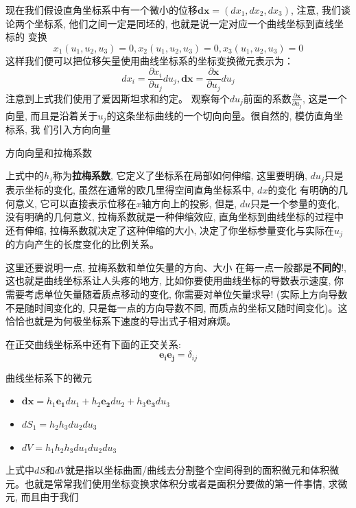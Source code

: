 现在我们假设直角坐标系中有一个微小的位移$\bm{dx}=(dx_1,dx_2,dx_3)$, 注意, 我们谈论两个坐标系, 他们之间一定是同坯的, 也就是说一定对应一个曲线坐标到直线坐标的
变换$$x_1(u_1,u_2,u_3)=0,x_2(u_1,u_2,u_3)=0,x_3(u_1,u_2,u_3)=0$$这样我们便可以把位移矢量使用曲线坐标系的坐标变换微元表示为：
$$dx_i=\frac{\partial x_i}{\partial u_j}du_j,\bm{dx}=\frac{\partial \bm{x}}{\partial u_j}du_j$$注意到上式我们使用了爱因斯坦求和约定。
观察每个$du_j$前面的系数$\frac{\partial \bm{x}}{\partial u_j}$, 这是一个向量, 而且是沿着关于$u_j$的这条坐标曲线的一个切向向量。很自然的, 模仿直角坐标系, 我
们引入方向向量
\begin{define}{方向向量和拉梅系数}
    \begin{lequation}
\end{lequation}
\end{define}
上式中的$h_j$称为\textbf{拉梅系数}, 它定义了坐标系在局部如何伸缩, 这里要明确, $du_j$只是表示坐标的变化, 虽然在通常的欧几里得空间直角坐标系中, $dx$的变化
有明确的几何意义, 它可以直接表示位移在$x$轴方向上的投影, 但是, $du$只是一个参量的变化, 没有明确的几何意义, 拉梅系数就是一种伸缩效应, 直角坐标到曲线坐标的过程中
还有伸缩, 拉梅系数就决定了这种伸缩的大小, 决定了你坐标参量变化与实际在$u_j$的方向产生的长度变化的比例关系。
\begin{thinknote}
    这里还要说明一点, 拉梅系数和单位矢量的方向、大小
    在每一点一般都是\textbf{不同的}!, 这也就是曲线坐标系让人头疼的地方, 比如你要使用曲线坐标的导数表示速度, 你需要考虑单位矢量随着质点移动的变化, 你需要对单位矢量求导!
    (实际上方向导数不是随时间变化的, 只是每一点的方向导数不同, 而质点的坐标又随时间变化)。这恰恰也就是为何极坐标系下速度的导出式子相对麻烦。
\end{thinknote}
在正交曲线坐标系中还有下面的正交关系:$$\bm{e_i}\bm{e_j}=\delta_{ij}$$
\begin{theorem}{曲线坐标系下的微元}
    \begin{itemize}
        \item $\bm{dx}=h_1\bm{e_1}du_1+h_2\bm{e_2}du_2+h_3\bm{e_3}du_3$
        \item $dS_1=h_2h_3du_2du_3$
        \item $dV=h_1h_2h_3du_1du_2du_3$
    \end{itemize}
\end{theorem}
上式中$dS$和$dV$就是指以坐标曲面/曲线去分割整个空间得到的面积微元和体积微元。也就是常常我们使用坐标变换求体积分或者是面积分要做的第一件事情, 求微元, 而且由于我们
